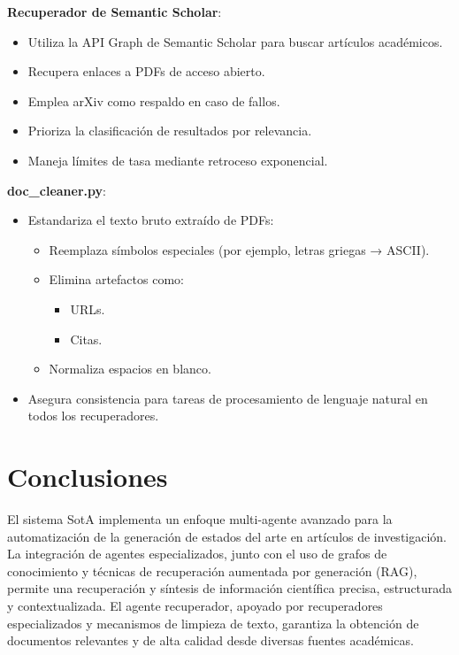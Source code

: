 \documentclass[12pt]{article}
\begin{document}
    
\textbf{Recuperador de Semantic Scholar}:
\begin{itemize}
    \item Utiliza la API Graph de Semantic Scholar para buscar artículos académicos.
    \item Recupera enlaces a PDFs de acceso abierto.
    \item Emplea arXiv como respaldo en caso de fallos.
    \item Prioriza la clasificación de resultados por relevancia.
    \item Maneja límites de tasa mediante retroceso exponencial.
\end{itemize}

    
\textbf{doc\_cleaner.py}:
\begin{itemize}
    \item Estandariza el texto bruto extraído de PDFs:
        \begin{itemize}
            \item Reemplaza símbolos especiales (por ejemplo, letras griegas → ASCII).
            \item Elimina artefactos como:
                \begin{itemize}
                    \item URLs.
                    \item Citas.
                \end{itemize}
            \item Normaliza espacios en blanco.
        \end{itemize}
    \item Asegura consistencia para tareas de procesamiento de lenguaje natural en todos los recuperadores.
\end{itemize}

\section{Conclusiones}

El sistema SotA implementa un enfoque multi-agente avanzado para la automatización de la generación de estados del arte en artículos de investigación. La integración de agentes especializados, junto con el uso de grafos de conocimiento y técnicas de recuperación aumentada por generación (RAG), permite una recuperación y síntesis de información científica precisa, estructurada y contextualizada. El agente recuperador, apoyado por recuperadores especializados y mecanismos de limpieza de texto, garantiza la obtención de documentos relevantes y de alta calidad desde diversas fuentes académicas.
\end{document}
